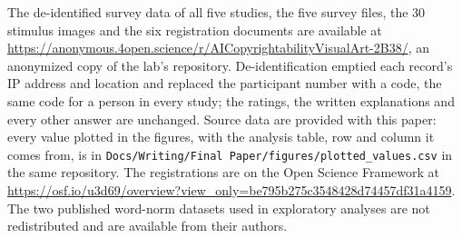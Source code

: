 The de-identified survey data of all five studies, the five survey files, the 30 stimulus images and the six registration documents are available at \url{https://anonymous.4open.science/r/AICopyrightabilityVisualArt-2B38/}, an anonymized copy of the lab's repository. De-identification emptied each record's IP address and location and replaced the participant number with a code, the same code for a person in every study; the ratings, the written explanations and every other answer are unchanged. Source data are provided with this paper: every value plotted in the figures, with the analysis table, row and column it comes from, is in \texttt{Docs/Writing/Final Paper/figures/plotted\_values.csv} in the same repository. The registrations are on the Open Science Framework at \url{https://osf.io/u3d69/overview?view_only=be795b275c3548428d74457df31a4159}. The two published word-norm datasets used in exploratory analyses are not redistributed and are available from their authors.\cite{warriner2013norms,brysbaert2014concreteness}
